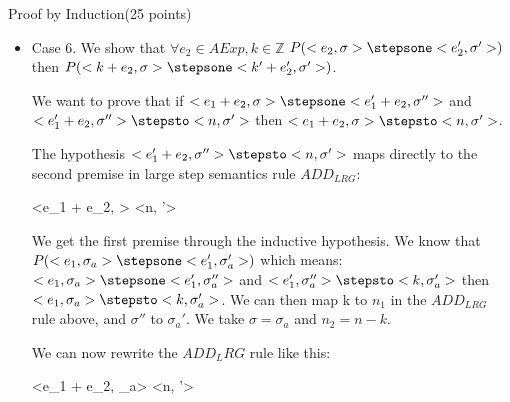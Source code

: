 \documentclass{article}
\begin{document}
\begin{question}{Proof by Induction}{(25 points)}
\begin{subquestion}
\begin{itemize}
The hypothesis $<e_1'+e_2, \sigma''> \stepsto <n, \sigma'>$ maps directly to the second premise in large step semantics rule $ADD_{LRG}$:

{
	<e_1 + e_2, \sigma> \stepsto <n, \sigma'>
}
{
}

We get the first premise through the inductive hypothesis. We know that $P(<e_1, \sigma_a>  \stepsone <e_1', \sigma_a'>)$ which means: $<e_1, \sigma_a> \stepsone <e_1', \sigma_a''>$ and $<e_1', \sigma_a''> \stepsto <k, \sigma_a'>$ then $<e_1, \sigma_a> \stepsto <k, \sigma_a'>$. We can then map k to $n_1$ in the $ADD_{LRG}$ rule above, and $\sigma''$ to $\sigma_a'$. We take $\sigma = \sigma_a$ and $n_2 = n - k$.

We can now rewrite the $ADD_LRG$ rule like this:

{
	<e_1 + e_2, \sigma_a> \stepsto <n, \sigma'>
}
{
}

\item Case 6. We show that $\forall e_2 \in AExp, k \in \mathbb{Z}$ $P(<e_2, \sigma> \stepsone <e_2', \sigma'>)$ then $P(<k+e_2, \sigma> \stepsone <k'+e_2', \sigma'>)$.

We want to prove that if $<e_1+e_2, \sigma> \stepsone <e_1'+e_2, \sigma''>$ and $<e_1'+e_2, \sigma''> \stepsto <n, \sigma'>$ then $<e_1+e_2, \sigma> \stepsto <n, \sigma'>$.

The hypothesis $<e_1'+e_2, \sigma''> \stepsto <n, \sigma'>$ maps directly to the second premise in large step semantics rule $ADD_{LRG}$:

{
	<e_1 + e_2, \sigma> \stepsto <n, \sigma'>
}
{
}

We get the first premise through the inductive hypothesis. We know that $P(<e_1, \sigma_a>  \stepsone <e_1', \sigma_a'>)$ which means: $<e_1, \sigma_a> \stepsone <e_1', \sigma_a''>$ and $<e_1', \sigma_a''> \stepsto <k, \sigma_a'>$ then $<e_1, \sigma_a> \stepsto <k, \sigma_a'>$. We can then map k to $n_1$ in the $ADD_{LRG}$ rule above, and $\sigma''$ to $\sigma_a'$. We take $\sigma = \sigma_a$ and $n_2 = n - k$.

We can now rewrite the $ADD_LRG$ rule like this:

{
	<e_1 + e_2, \sigma_a> \stepsto <n, \sigma'>
}
{
}




\end{itemize}
\end{subquestion}
\end{question}
\end{document}
